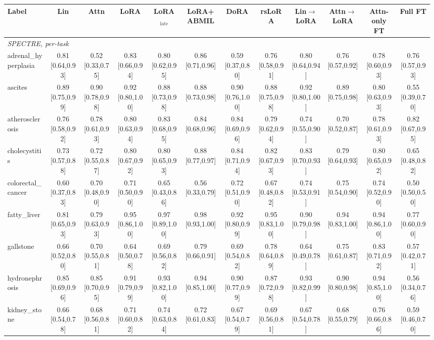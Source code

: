 \begin{tabular}{lccccccccccc}
\toprule
Label & Lin & Attn & LoRA & LoRA$_{\text{late}}$ & LoRA+ABMIL & DoRA & rsLoRA & Lin$\to$LoRA & Attn$\to$LoRA & Attn-only FT & Full FT \\
\midrule
\multicolumn{12}{l}{\textit{SPECTRE, per-task}} \\
adrenal\_hyperplasia & 0.81 [0.64,0.93] & 0.52 [0.33,0.75] & 0.83 [0.66,0.94] & 0.80 [0.62,0.95] & 0.86 [0.71,0.96] & 0.59 [0.37,0.80] & 0.76 [0.58,0.91] & 0.80 [0.64,0.94] & 0.76 [0.57,0.92] & 0.78 [0.60,0.93] & 0.76 [0.57,0.93] \\
ascites & 0.89 [0.75,0.99] & 0.90 [0.78,0.98] & 0.92 [0.80,1.00] & 0.88 [0.73,0.98] & 0.88 [0.73,0.98] & 0.90 [0.76,1.00] & 0.88 [0.75,0.98] & 0.92 [0.80,1.00] & 0.89 [0.75,0.98] & 0.80 [0.63,0.93] & 0.55 [0.39,0.70] \\
atherosclerosis & 0.76 [0.58,0.92] & 0.78 [0.61,0.93] & 0.80 [0.63,0.94] & 0.83 [0.68,0.95] & 0.84 [0.68,0.96] & 0.84 [0.69,0.96] & 0.79 [0.62,0.94] & 0.74 [0.55,0.90] & 0.70 [0.52,0.87] & 0.78 [0.61,0.93] & 0.82 [0.67,0.95] \\
cholecystitis & 0.73 [0.57,0.88] & 0.72 [0.55,0.87] & 0.80 [0.67,0.92] & 0.80 [0.65,0.93] & 0.88 [0.77,0.97] & 0.84 [0.71,0.94] & 0.82 [0.67,0.93] & 0.83 [0.70,0.93] & 0.79 [0.64,0.93] & 0.80 [0.65,0.92] & 0.65 [0.48,0.82] \\
colorectal\_cancer & 0.60 [0.37,0.83] & 0.70 [0.48,0.90] & 0.71 [0.50,0.90] & 0.65 [0.43,0.86] & 0.56 [0.33,0.79] & 0.72 [0.51,0.90] & 0.67 [0.48,0.82] & 0.74 [0.53,0.91] & 0.75 [0.54,0.90] & 0.74 [0.52,0.90] & 0.50 [0.50,0.50] \\
fatty\_liver & 0.81 [0.65,0.93] & 0.79 [0.63,0.93] & 0.95 [0.86,1.00] & 0.97 [0.89,1.00] & 0.98 [0.93,1.00] & 0.92 [0.80,0.99] & 0.95 [0.83,1.00] & 0.90 [0.79,0.98] & 0.94 [0.83,1.00] & 0.94 [0.86,1.00] & 0.77 [0.60,0.90] \\
gallstone & 0.66 [0.52,0.80] & 0.70 [0.55,0.81] & 0.64 [0.50,0.78] & 0.69 [0.56,0.82] & 0.79 [0.66,0.91] & 0.69 [0.54,0.82] & 0.78 [0.64,0.89] & 0.64 [0.49,0.78] & 0.75 [0.61,0.87] & 0.83 [0.71,0.92] & 0.57 [0.42,0.71] \\
hydronephrosis & 0.85 [0.69,0.96] & 0.85 [0.70,0.95] & 0.91 [0.79,0.99] & 0.93 [0.82,1.00] & 0.94 [0.85,1.00] & 0.90 [0.77,0.99] & 0.87 [0.72,0.98] & 0.93 [0.82,0.99] & 0.90 [0.80,0.98] & 0.94 [0.85,1.00] & 0.56 [0.34,0.76] \\
kidney\_stone & 0.66 [0.54,0.78] & 0.68 [0.56,0.81] & 0.71 [0.60,0.82] & 0.74 [0.63,0.84] & 0.72 [0.61,0.83] & 0.67 [0.54,0.79] & 0.69 [0.56,0.81] & 0.67 [0.54,0.78] & 0.68 [0.55,0.79] & 0.76 [0.66,0.86] & 0.59 [0.46,0.70] \\

\end{tabular}
